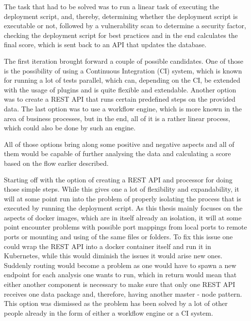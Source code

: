 The task that had to be solved was to run a linear task of executing the deployment script, and, thereby, determining whether the deployment script is executable or not, followed by a vulnerability scan to determine a security factor, checking the deployment script for best practices and in the end calculates the final score, which is sent back to an API that updates the database.

The first iteration brought forward a couple of possible candidates. One of those is the possibility of using a Continuous Integration (CI) system, which is known for running a lot of tests parallel, which can, depending on the CI, be extended with the usage of plugins and is quite flexible and extendable. Another option was to create a REST API that runs certain predefined steps on the provided data. The last option was to use a workflow engine, which is more known in the area of business processes, but in the end, all of it is a rather linear process, which could also be done by such an engine.

All of those options bring along some positive and negative aspects and all of them would be capable of further analysing the data and calculating a score based on the flow earlier described.

Starting off with the option of creating a REST API and processor for doing those simple steps. While this gives one a lot of flexibility and expandability, it will at some point run into the problem of properly isolating the process that is executed by running the deployment script. As this thesis mainly focuses on the aspects of docker images, which are in itself already an isolation, it will at some point encounter problems with possible port mappings from local ports to remote ports or mounting and using of the same files or folders. To fix this issue one could wrap the REST API into a docker container itself and run it in Kubernetes, while this would diminish the issues it would arise new ones. Suddenly routing would become a problem as one would have to spawn a new endpoint for each analysis one wants to run, which in return would mean that either another component is necessary to make sure that only one REST API receives one data package and, therefore, having another master - node pattern.
This option was dismissed as the problem has been solved by a lot of other people already in the form of either a workflow engine or a CI system.

